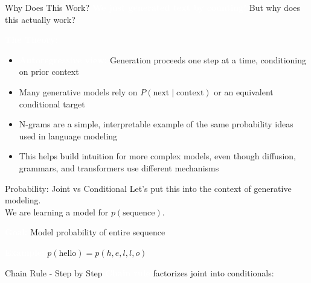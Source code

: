 \documentclass[aspectratio=169]{beamer}
\renewcommand{\textbf}[1]{\textcolor{white}{\bfseries #1}}
\begin{document}
\begin{frame}{Why Does This Work?}
\textbf{We just generated text by counting!} But why does this actually work?

\vspace{1em}
\textbf{The Theory:}

\begin{itemize}
    \item<1-> \textbf{Autoregressive view:} Generation proceeds one step at a time, conditioning on prior context
    \item<2-> Many generative models rely on $P(\text{next} \mid \text{context})$ or an equivalent conditional target
    \item<3-> N-grams are a simple, interpretable example of the same probability ideas used in language modeling
    \item<4-> This helps build intuition for more complex models, even though diffusion, grammars, and transformers use different mechanisms
\end{itemize}
\end{frame}

\begin{frame}[c]{Probability: Joint vs Conditional}
Let's put this into the context of generative modeling.\\
We are learning a model for $p(\text{sequence})$.

\vspace{1em}
\textbf{Goal:} Model probability of entire sequence

\vspace{0.5em}
\textbf{Example:} $p(\text{hello}) = p(h, e, l, l, o)$
\end{frame}

\begin{frame}{Chain Rule - Step by Step}
\textbf{Chain rule} factorizes joint into conditionals:

\vspace{1em}

\vspace{0.5em}

\vspace{0.5em}

\vspace{0.5em}
\end{frame}
\end{document}
